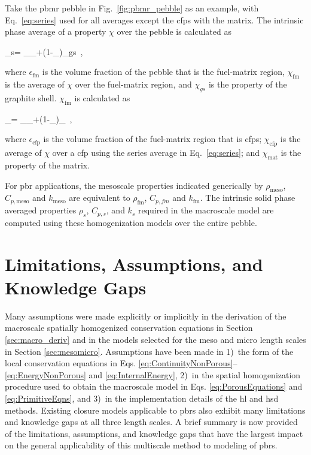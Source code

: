 Take the \gls{pbmr} pebble in Fig.\ \ref{fig:pbmr_pebble} as an example, with Eq.\ \eqref{eq:series} used for all averages except the \glspl{cfp} with the matrix. The intrinsic phase average of a property \(\chi\) over the pebble is calculated as

\beq
\label{eq:NonTransport2}
\chi_s= \epsilon_\chi_+(1-\epsilon_)\chi_{gs}\ ,
\eeq

\noindent where \(\epsilon_\text{fm}\) is the volume fraction of the pebble that is the fuel-matrix region, \(\chi_\text{fm}\) is the average of \(\chi\) over the fuel-matrix region, and \(\chi_{gs}\) is the property of the graphite shell. \(\chi_\text{fm}\) is calculated as

\beq
\label{eq:NonTransport}
\chi_= \epsilon_\chi_+(1-\epsilon_)\chi_\ ,
\eeq

\noindent where \(\epsilon_\text{cfp}\) is the volume fraction of the fuel-matrix region that is \glspl{cfp}; \(\chi_\text{cfp}\) is the average of \(\chi\) over a \gls{cfp} using the series average in Eq.\ \eqref{eq:series}; and \(\chi_\text{mat}\) is the property of the matrix. 

For \gls{pbr} applications, the mesoscale properties indicated generically by \(\rho_\text{meso}\), \(C_{p,\text{meso}}\) and \(k_\text{meso}\) are equivalent to \(\rho_\text{fm}\), \(C_{p,fm}\) and \(k_\text{fm}\). The intrinsic solid phase averaged properties \(\rho_s\), \(C_{p,s}\), and \(k_s\) required in the macroscale model are computed using these homogenization models over the entire pebble.

\section{Limitations, Assumptions, and Knowledge Gaps}
\label{sec:MacroAssumptions}

Many assumptions were made explicitly or implicitly in the derivation of the macroscale spatially homogenized conservation equations in Section \ref{sec:macro_deriv} and in the models selected for the meso and micro length scales in Section \ref{sec:mesomicro}. Assumptions have been made in 1)~the form of the local conservation equations in Eqs. \eqref{eq:ContinuityNonPorous}--\eqref{eq:EnergyNonPorous} and \eqref{eq:InternalEnergy}, 2)~in the spatial homogenization procedure used to obtain the macroscale model in Eqs. \eqref{eq:PorousEquations} and \eqref{eq:PrimitiveEqns}, and 3)~in the implementation details of the \gls{hl} and \gls{hsd} methods. Existing closure models applicable to \glspl{pbr} also exhibit many limitations and knowledge gaps at all three length scales. A brief summary is now provided of the limitations, assumptions, and knowledge gaps that have the largest impact on the general applicability of this multiscale method to modeling of \glspl{pbr}.

